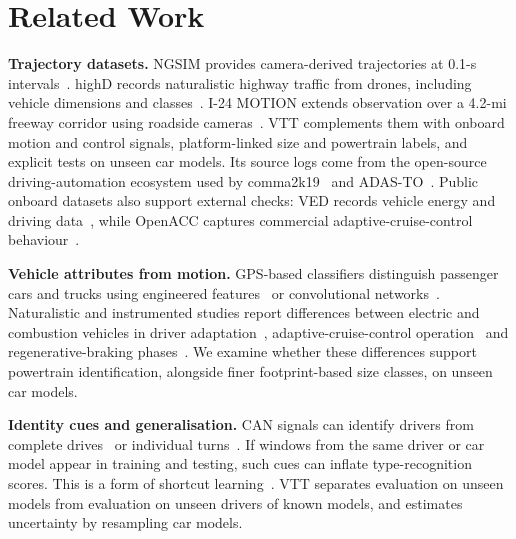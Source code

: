\section{Related Work}\label{sec:related}

\textbf{Trajectory datasets.} NGSIM provides camera-derived trajectories at 0.1-s intervals~\cite{fhwa2016ngsim}. highD records naturalistic highway traffic from drones, including vehicle dimensions and classes~\cite{krajewski2018highd}. I-24 MOTION extends observation over a 4.2-mi freeway corridor using roadside cameras~\cite{gloudemans2023motion}. VTT complements them with onboard motion and control signals, platform-linked size and powertrain labels, and explicit tests on unseen car models. Its source logs come from the open-source driving-automation ecosystem used by comma2k19~\cite{schafer2018comma2k19} and ADAS-TO~\cite{wang2026adasto}. Public onboard datasets also support external checks: VED records vehicle energy and driving data~\cite{oh2019ved}, while OpenACC captures commercial adaptive-cruise-control behaviour~\cite{makridis2021openacc}.

\textbf{Vehicle attributes from motion.} GPS-based classifiers distinguish passenger cars and trucks using engineered features~\cite{sun2013gps} or convolutional networks~\cite{dabiri2020gps}. Naturalistic and instrumented studies report differences between electric and combustion vehicles in driver adaptation~\cite{helmbrecht2014ev}, adaptive-cruise-control operation~\cite{geffen2026ev} and regenerative-braking phases~\cite{liu2025paai}. We examine whether these differences support powertrain identification, alongside finer footprint-based size classes, on unseen car models.

\textbf{Identity cues and generalisation.} CAN signals can identify drivers from complete drives~\cite{enev2016fingerprinting} or individual turns~\cite{hallac2016turn}. If windows from the same driver or car model appear in training and testing, such cues can inflate type-recognition scores. This is a form of shortcut learning~\cite{geirhos2020shortcut}. VTT separates evaluation on unseen models from evaluation on unseen drivers of known models, and estimates uncertainty by resampling car models.
